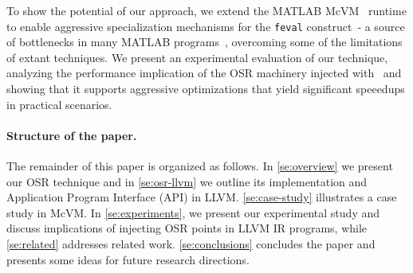 
\noindent To show the potential of our approach, we extend the MATLAB McVM~\cite{chevalier2010mcvm} runtime to enable aggressive specialization mechanisms for the {\tt feval} construct\ - a source of bottlenecks in many MATLAB programs~\cite{lameed2013feval, radpour2013refactoring}, overcoming some of the limitations of extant techniques\cite{lameed2013feval}. We present an experimental evaluation of our technique, analyzing the performance implication of the OSR machinery injected with \osrkit\ and showing that it supports aggressive optimizations that yield significant speeedups in practical scenarios.



\paragraph{Structure of the paper.}
The remainder of this paper is organized as follows. In \mysection\ref{se:overview} we present our OSR technique and in \mysection\ref{se:osr-llvm} we outline its implementation and Application Program Interface (API) in LLVM. \mysection\ref{se:case-study} illustrates a case study in McVM. In \mysection\ref{se:experiments}, we present our experimental study and discuss implications of injecting OSR points in LLVM IR programs, while \mysection\ref{se:related} addresses related work. \mysection\ref{se:conclusions} concludes the paper and presents some ideas for future research directions.